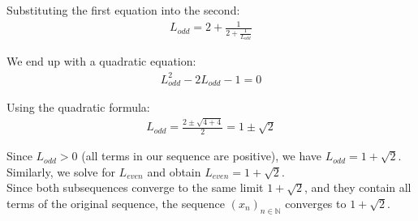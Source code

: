 \documentclass{article}
\begin{document}
Substituting the first equation into the second:
\begin{align*}
L_{odd} = 2 + \frac{1}{2 + \frac{1}{L_{odd}}}
\end{align*}

We end up with a quadratic equation:
\begin{align*}
L_{odd}^2 - 2L_{odd} - 1 = 0
\end{align*}

Using the quadratic formula:
\begin{align*}
L_{odd} = \frac{2 \pm \sqrt{4 + 4}}{2} = 1 \pm \sqrt{2}
\end{align*}

Since $L_{odd} > 0$ (all terms in our sequence are positive), we have $L_{odd} = 1 + \sqrt{2}$. \\

Similarly, we solve for $L_{even}$ and obtain $L_{even} = 1 + \sqrt{2}$. \\

Since both subsequences converge to the same limit $1 + \sqrt{2}$, and they contain all terms of the original sequence, the sequence $(x_n)_{n \in \mathbb{N}}$ converges to $1 + \sqrt{2}$.
\end{document}
